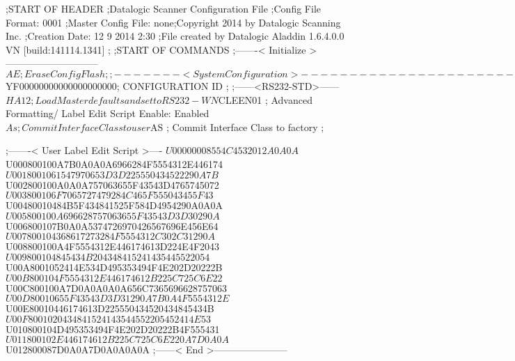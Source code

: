 ;START OF HEADER
;Datalogic Scanner Configuration File
;Config File Format: 0001
;Master Config File: none;Copyright 2014 by Datalogic Scanning Inc.
;Creation Date: 12 9 2014 2:30
;File created by Datalogic Aladdin 1.6.4.0.0 VN [build:141114.1341]
;
;START OF COMMANDS
;-------< Initialize >-----------------------------
$AE                 ; Erase Config Flash
;
;-------< System Configuration >-------------------------------
$YF00000000000000000000; CONFIGURATION ID
;
;------<RS232-STD>------
$HA12               ; Load Master defaults and set to RS232-WN
$CLEEN01            ; Advanced Formatting/ Label Edit Script Enable: Enabled
$As                 ; Commit Interface Class to user
$AS                 ; Commit Interface Class to factory
;

;-------< User Label Edit Script >----
$U00000008554C4532012A0A0A
$U000800100A7B0A0A0A6966284F5554312E446174
$U0018001061547970653D3D225550434522290A7B
$U002800100A0A0A757063655F43543D4765745072
$U003800106F7065727479284C465F555043455F43
$U00480010484B5F434841525F584D4954290A0A0A
$U005800100A696628757063655F43543D3D30290A
$U006800107B0A0A5374726970426567696E456E64
$U007800104368617273284F5554312C302C31290A
$U008800100A4F5554312E446174613D224E4F2043
$U009800104845434B204348415241435445522054
$U00A8001052414E534D495353494F4E202D20222B
$U00B800104F5554312E446174612B225C725C6E22
$U00C800100A7D0A0A0A0A656C7365696628757063
$U00D80010655F43543D3D31290A7B0A4F5554312E
$U00E80010446174613D225550434520434845434B
$U00F8001020434841524143544552205452414E53
$U010800104D495353494F4E202D20222B4F555431
$U011800102E446174612B225C725C6E220A7D0A0A
$U012800087D0A0A7D0A0A0A0A
;------< End >-----------------------

